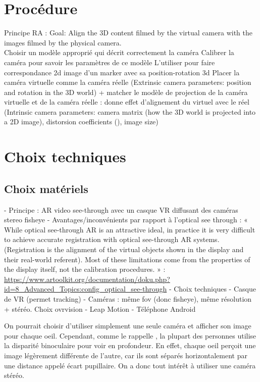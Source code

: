 
\section{Procédure}
Principe RA :
Goal: Align the 3D content filmed by the virtual camera with the images filmed by the physical camera.\\
Choisir un modèle approprié qui décrit correctement la caméra
Calibrer la caméra pour savoir les paramètres de ce modèle
L'utiliser pour faire correspondance 2d image d'un marker avec sa position-rotation 3d
Placer la caméra virtuelle comme la caméra réelle (Extrinsic camera parameters: position and rotation in the 3D world) + matcher le modèle de projection de la caméra virtuelle et de la caméra réelle : donne effet d'alignement du virtuel avec le réel (Intrinsic camera parameters: camera matrix (how the 3D world is projected into a 2D image), distorsion coefficients (), image size)


\section{Choix techniques}
\subsection{Choix matériels}
- Principe : AR video see-through avec un casque VR diffusant des caméras stereo fisheye
  - Avantages/inconvénients par rapport à l'optical see through : « While optical see-through AR is an attractive ideal, in practice it is very difficult to achieve accurate registration with optical see-through AR systems. (Registration is the alignment of the virtual objects shown in the display and their real-world referent). Most of these limitations come from the properties of the display itself, not the calibration procedures. » : \url{https://www.artoolkit.org/documentation/doku.php?id=8_Advanced_Topics:config_optical_see-through}
- Choix techniques
  - Casque de VR (permet tracking)
  - Caméras : même fov (donc fisheye), même résolution + stéréo. Choix ovrvision
  - Leap Motion
  - Téléphone Android

On pourrait choisir d'utiliser simplement une seule caméra et afficher son image pour chaque oeil. Cependant, comme le rappelle \citep{Bourke1999}, la plupart des personnes utilise la disparité binoculaire pour voir en profondeur. En effet, chaque oeil perçoit une image légèrement différente de l'autre, car ils sont séparés horizontalement par une distance appelé écart pupillaire. On a donc tout intérêt à utiliser une caméra stéréo.

